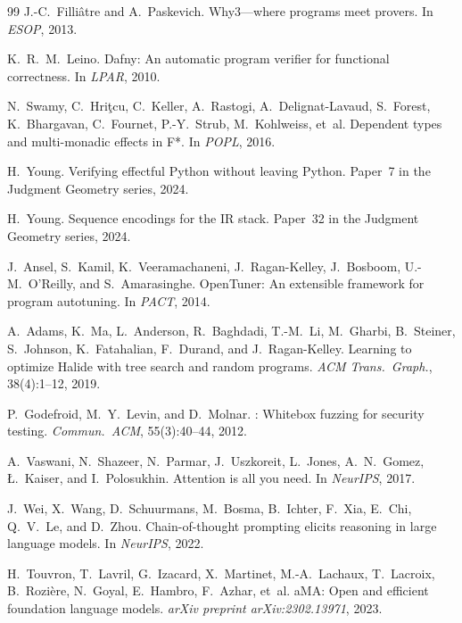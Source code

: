 \documentclass[11pt]{article}
\begin{document}
\begin{thebibliography}{99}
J.-C.~Filliâtre and A.~Paskevich.
\newblock Why3---where programs meet provers.
\newblock In \emph{ESOP}, 2013.

K.~R.~M.~Leino.
\newblock Dafny: An automatic program verifier for functional
  correctness.
\newblock In \emph{LPAR}, 2010.

N.~Swamy, C.~Hriţcu, C.~Keller, A.~Rastogi, A.~Delignat-Lavaud,
  S.~Forest, K.~Bhargavan, C.~Fournet, P.-Y.~Strub, M.~Kohlweiss,
  et~al.
\newblock Dependent types and multi-monadic effects in {F*}.
\newblock In \emph{POPL}, 2016.

H.~Young.
\newblock Verifying effectful {P}ython without leaving {P}ython.
\newblock Paper~7 in the Judgment Geometry series, 2024.

H.~Young.
\newblock Sequence encodings for the {IR} stack.
\newblock Paper~32 in the Judgment Geometry series, 2024.

J.~Ansel, S.~Kamil, K.~Veeramachaneni, J.~Ragan-Kelley,
  J.~Bosboom, U.-M.~O'Reilly, and S.~Amarasinghe.
\newblock Open{T}uner: An extensible framework for program
  autotuning.
\newblock In \emph{PACT}, 2014.

A.~Adams, K.~Ma, L.~Anderson, R.~Baghdadi, T.-M.~Li,
  M.~Gharbi, B.~Steiner, S.~Johnson, K.~Fatahalian, F.~Durand,
  and J.~Ragan-Kelley.
\newblock Learning to optimize {H}alide with tree search and random
  programs.
\newblock \emph{ACM Trans.\ Graph.}, 38(4):1--12, 2019.

P.~Godefroid, M.~Y.~Levin, and D.~Molnar.
: Whitebox fuzzing for security testing.
\newblock \emph{Commun.\ ACM}, 55(3):40--44, 2012.

A.~Vaswani, N.~Shazeer, N.~Parmar, J.~Uszkoreit, L.~Jones,
  A.~N.~Gomez, {\L}.~Kaiser, and I.~Polosukhin.
\newblock Attention is all you need.
\newblock In \emph{NeurIPS}, 2017.

J.~Wei, X.~Wang, D.~Schuurmans, M.~Bosma, B.~Ichter,
  F.~Xia, E.~Chi, Q.~V.~Le, and D.~Zhou.
\newblock Chain-of-thought prompting elicits reasoning in large
  language models.
\newblock In \emph{NeurIPS}, 2022.

H.~Touvron, T.~Lavril, G.~Izacard, X.~Martinet,
  M.-A.~Lachaux, T.~Lacroix, B.~Rozi{\`e}re, N.~Goyal,
  E.~Hambro, F.~Azhar, et~al.
a{MA}: Open and efficient foundation language models.
\newblock \emph{arXiv preprint arXiv:2302.13971}, 2023.


\end{thebibliography}
\end{document}
